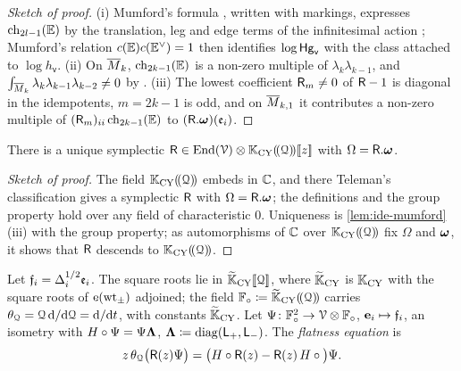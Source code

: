 \begin{proof}[Sketch of proof]
(i) Mumford's formula \cite[Section~1.1]{FP00}, written with markings, expresses $\mathrm{ch}_{2l-1}(\mathbb{E})$ by the translation, leg and edge terms of the infinitesimal action \cite[Prop.~2.14]{PPZ15}; Mumford's relation $c(\mathbb{E})c(\mathbb{E}^\vee)=1$ \cite[(5.4), (5.5)]{Mum83} then identifies $\log\mathsf{Hg}_{\mathsf{v}}$ with the class attached to $\log h_{\mathsf{v}}$. (ii) On $\overline{M}_k$, $\mathrm{ch}_{2k-1}(\mathbb{E})$ is a non-zero multiple of $\lambda_k\lambda_{k-1}$, and $\int_{\overline{M}_k}\lambda_k\lambda_{k-1}\lambda_{k-2}\neq0$ by \cite[Theorem~4]{FP00}. (iii) The lowest coefficient $\mathsf{R}_m\neq0$ of $\mathsf{R}-1$ is diagonal in the idempotents, $m=2k-1$ is odd, and on $\overline{M}_{k,1}$ it contributes a non-zero multiple of $(\mathsf{R}_m)_{ii}\,\mathrm{ch}_{2k-1}(\mathbb{E})$ to $(\mathsf{R}.\boldsymbol{\omega})(\mathfrak{e}_i)$.
\end{proof}

\begin{prop}
\label{prop:ide-teleman}
There is a unique symplectic $\mathsf{R}\in\operatorname{End}(\mathcal{V})\otimes\mathbb{K}_{\mathrm{CY}}(\!(\mathcal{Q})\!)[\![ z ]\!]$ with $\Omega=\mathsf{R}.\boldsymbol{\omega}$.
\end{prop}

\begin{proof}[Sketch of proof]
The field $\mathbb{K}_{\mathrm{CY}}(\!(\mathcal{Q})\!)$ embeds in $\mathbb{C}$, and there Teleman's classification \cite[(1.15), Theorem~(2), Prop.~8.7(ii)]{Tel12} gives a symplectic $\mathsf{R}$ with $\Omega=\mathsf{R}.\boldsymbol{\omega}$; the definitions and the group property \cite[Defs.~2.2, 2.5, 2.13 and Prop.~2.14]{PPZ15} hold over any field of characteristic $0$. Uniqueness is \cref{lem:ide-mumford}(iii) with the group property; as automorphisms of $\mathbb{C}$ over $\mathbb{K}_{\mathrm{CY}}(\!(\mathcal{Q})\!)$ fix $\Omega$ and $\boldsymbol{\omega}$, it shows that $\mathsf{R}$ descends to $\mathbb{K}_{\mathrm{CY}}(\!(\mathcal{Q})\!)$.
\end{proof}

Let $\mathfrak{f}_i=\Delta_i^{1/2}\mathfrak{e}_i$. The square roots lie in $\widetilde{\mathbb{K}}_{\mathrm{CY}}[\![ \mathcal{Q} ]\!]$, where $\widetilde{\mathbb{K}}_{\mathrm{CY}}$ is $\mathbb{K}_{\mathrm{CY}}$ with the square roots of $\mathrm{e}(\mathrm{wt}_\pm)$ adjoined; the field $\mathbb{F}_{\circ}\coloneqq\widetilde{\mathbb{K}}_{\mathrm{CY}}(\!(\mathcal{Q})\!)$ carries $\theta_{\mathcal{Q}}=\mathcal{Q}\,\mathrm{d}/\mathrm{d}\mathcal{Q}=\mathrm{d}/\mathrm{d} t$, with constants $\widetilde{\mathbb{K}}_{\mathrm{CY}}$. Let $\Psi\colon\mathbb{F}_{\circ}^2\to\mathcal{V}\otimes\mathbb{F}_{\circ}$, $\mathbf{e}_i\mapsto\mathfrak{f}_i$, an isometry with $H\circ\Psi=\Psi\boldsymbol{\Lambda}$, $\boldsymbol{\Lambda}\coloneqq\mathrm{diag}(\mathsf{L}_+,\mathsf{L}_-)$. The \emph{flatness equation} is
\begin{equation}
\label{eq:ide-flat}
z\,\theta_{\mathcal{Q}}\big(\mathsf{R}(z)\Psi\big)=\big(H\circ\mathsf{R}(z)-\mathsf{R}(z)\,H\circ\big)\Psi .
\end{equation}

